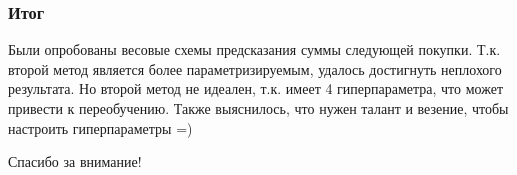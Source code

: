 \documentclass{beamer}
\begin{document}

\begin{frame}
\frametitle{Итог}

Были опробованы весовые схемы предсказания суммы следующей покупки. Т.к. второй метод является более параметризируемым, удалось достигнуть неплохого результата. Но второй метод не идеален, т.к. имеет 4 гиперпараметра, что может привести к переобучению. Также выяснилось, что нужен талант и везение, чтобы настроить гиперпараметры =)

\end{frame}


\begin{frame}
\LARGE{\centerline{Спасибо за внимание!}}
\end{frame}

\end{document}
